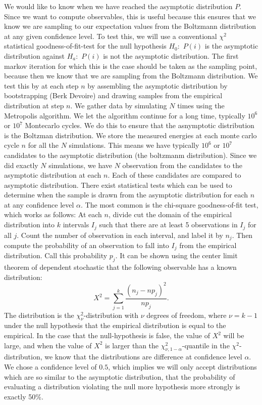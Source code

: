 \documentclass[11pt,english,a4paper]{article}
\begin{document}
We would like to know when we have reached the asymptotic distribution $P$. Since we want to compute observables, this is useful because this ensures  that we know we are sampling to our expectation values from the Boltzmann distribution at any given confidence level. To test this, we will use a conventional $\chi^2$ statistical goodness-of-fit-test for the null hypothesis $H_0:$ $P(i)$ is the asymptotic distribution against $H_a:$ $P(i)$ is not the asymptotic distribution. The first markov iteration for which this is the case should be taken as the sampling point, because then we know that we are sampling from the Boltzmann distribution. We test this by at each step $n$ by assembling the asymptotic distribution by bootstrapping (Berk Devoire) and drawing samples from the empirical distribution at step $n$. We gather data by simulating $N$ times using the Metropolis algorithm. We let the algorithm continue for a long time, typically $10^6$ or $10^7$ Montecarlo cycles. We do this to ensure that the asnymptotic distribution is the Boltzman distribution. We store the measured energies at each monte carlo cycle $n$ for all the $N$ simulations. This means we have typically $10^6$ or $10^7$ candidates to the asymptotic distribution (the boltzmanm distribution). Since we did exactly $N$ simulations, we have $N$ observation from the candidates to the asymptotic distribution at each $n$. Each of these candidates are compared to asymptotic distribution. There exist statistical tests which can be used to determine when the sample is drawn from the asymptotic distribution for each $n$ at any confidence level $\alpha$. The most common is the chi-square goodness-of-fit test, which works as follows: At each $n$, divide cut the domain of the empirical distribution into $k$ intervals $I_j$ such that there are at least 5 observations in $I_j$ for all $j$. Count the number of observation in each interval, and label it by $n_j$. Then compute the probability of an observation to fall into $I_j$ from the empirical distribution. Call this probability $p_j$. It can be shown using the center limit theorem of dependent stochastic that the following observable has a known distribution:
\[
X^2 = \sum_{j=1}^k \frac{(n_j - np_j )^2}{np_j}.
\]
The distribution is the $\chi^2_\nu$-distribution with $\nu$ degrees of freedom, where $\nu = k-1$ under the null hypothesis that the empirical distribution is equal to the empirical. In the case that the null-hypothesis is false, the value of $X^2$ will be large, and when the value of $X^2$ is larger than the $\chi^2_{\nu, 1-\alpha}$-quantile in the $\chi^2$-distribution, we know that the distributions are difference at confidence level $\alpha$. We chose a confidence level of $0.5$, which implies we will only accept distributions which are so similar to the asymptotic distribution, that the probability of evaluating a distribution violating the null more hypothesis more strongly is exactly 50\%.
\end{document}
